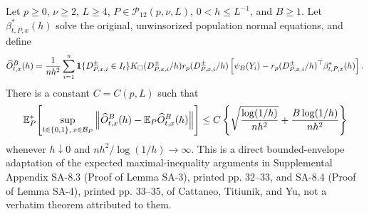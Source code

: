 Let \(p\geq0\), \(\nu\geq2\), \(L\geq4\), \(P\in\mathcal P_{12}(p,\nu,L)\), \(0<h\leq L^{-1}\), and \(B\geq1\).  Let \(\beta^*_{t,P,x}(h)\) solve the original, unwinsorized population normal equations, and define
\[
 \widehat O^B_{t,x}(h)={1\over nh^2}\sum_{i=1}^n
 \mathbf1\{D^{\pm}_{P,x,i}\in I_t\}K_\square(D^{\pm}_{P,x,i}/h)
 r_p(D^{\pm}_{P,x,i}/h)
 \left[\psi_B(Y_i)-r_p(D^{\pm}_{P,x,i}/h)^\top\beta^*_{t,P,x}(h)\right].
\]
There is a constant \(C=C(p,L)\) such that
\[
 \mathbb E_P^*\!\left[
 \sup_{t\in\{0,1\},\,x\in\mathcal B_P}
 \left\|\widehat O^B_{t,x}(h)-\mathbb E_P\widehat O^B_{t,x}(h)\right\|
 \right]
 \leq C\left\{
 \sqrt{{\log(1/h)\over nh^2}}+{B\log(1/h)\over nh^2}
 \right\}
\]
whenever \(h\downarrow0\) and \(nh^2/\log(1/h)\to\infty\).  This is a direct bounded-envelope adaptation of the expected maximal-inequality arguments in Supplemental Appendix SA-8.3 (Proof of Lemma SA-3), printed pp. 32--33, and SA-8.4 (Proof of Lemma SA-4), printed pp. 33--35, of Cattaneo, Titiunik, and Yu, not a verbatim theorem attributed to them.